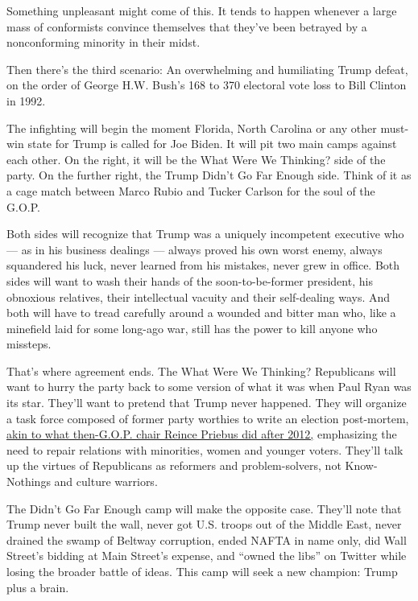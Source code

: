 Something unpleasant might come of this. It tends to happen whenever a
large mass of conformists convince themselves that they've been betrayed
by a nonconforming minority in their midst.

Then there's the third scenario: An overwhelming and humiliating Trump
defeat, on the order of George H.W. Bush's 168 to 370 electoral vote
loss to Bill Clinton in 1992.

The infighting will begin the moment Florida, North Carolina or any
other must-win state for Trump is called for Joe Biden. It will pit two
main camps against each other. On the right, it will be the What Were We
Thinking? side of the party. On the further right, the Trump Didn't Go
Far Enough side. Think of it as a cage match between Marco Rubio and
Tucker Carlson for the soul of the G.O.P.

Both sides will recognize that Trump was a uniquely incompetent
executive who --- as in his business dealings --- always proved his own
worst enemy, always squandered his luck, never learned from his
mistakes, never grew in office. Both sides will want to wash their hands
of the soon-to-be-former president, his obnoxious relatives, their
intellectual vacuity and their self-dealing ways. And both will have to
tread carefully around a wounded and bitter man who, like a minefield
laid for some long-ago war, still has the power to kill anyone who
missteps.

That's where agreement ends. The What Were We Thinking? Republicans will
want to hurry the party back to some version of what it was when Paul
Ryan was its star. They'll want to pretend that Trump never happened.
They will organize a task force composed of former party worthies to
write an election post-mortem,
\href{https://online.wsj.com/public/resources/documents/RNCreport03182013.pdf}{akin
to what then-G.O.P. chair Reince Priebus did after 2012,} emphasizing
the need to repair relations with minorities, women and younger voters.
They'll talk up the virtues of Republicans as reformers and
problem-solvers, not Know-Nothings and culture warriors.

The Didn't Go Far Enough camp will make the opposite case. They'll note
that Trump never built the wall, never got U.S. troops out of the Middle
East, never drained the swamp of Beltway corruption, ended NAFTA in name
only, did Wall Street's bidding at Main Street's expense, and ``owned
the libs'' on Twitter while losing the broader battle of ideas. This
camp will seek a new champion: Trump plus a brain.

